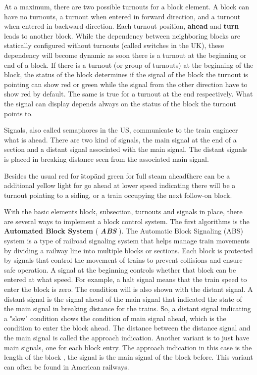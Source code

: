 
At a maximum, there are two possible turnouts for a block element. A block can have no turnouts, a turnout when entered in forward direction, and a turnout when entered in backward direction. Each turnout position, \textbf{ahead} and \textbf{turn} leads to another block. While the dependency between neighboring blocks are statically configured without turnouts (called switches in the UK), these dependency will become dynamic as soon there is a turnout at the beginning or end of a block. If there is a turnout (or group of turnouts) at the beginning of the block, the status of the block determines if the signal of the block the turnout is pointing can show red or green while the signal from the other direction have to show red by default. The same is true for a turnout at the end respectively. What the signal can display depends always on the status of the block the turnout points to.


Signals, also called semaphores in the US, communicate to the train engineer what is ahead. There are two kind of signals, the main signal at the end of a section and a distant signal associated with the main signal. The distant signals is placed in breaking distance seen from the associated main signal. 

Besides the usual red for \"stop\" and green for \"full steam ahead\" there can be a additional yellow light for go ahead at lower speed indicating there will be a turnout pointing to a siding, or a train occupying the next follow-on block.


With the basic elements  block, subsection, turnouts and signals in place, there are several ways to implement a block control system. The first algorithms is the \textbf{Automated Block System} ( \textbf{\textit{ABS}} ). The Automatic Block Signaling (ABS) system is a type of railroad signaling system that helps manage train movements by dividing a railway line into multiple blocks or sections. Each block is protected by signals that control the movement of trains to prevent collisions and ensure safe operation. A signal at the beginning controls whether that block can be entered at what speed. For example, a halt signal means that the train speed to enter the block is zero. The condition will is also shown with the distant signal. A distant signal is the signal ahead of the main signal that indicated the state of the main signal in breaking distance for the trains. So, a distant signal indicating a "slow" condition shows the condition of main signal ahead, which is the condition to enter the block ahead. The distance between the distance signal and the main signal is called the approach indication. Another variant is to just have main signals, one for each block entry. The approach indication in this case is the length of the block , the signal is the main signal of the block before. This variant can often be found in American railways.

